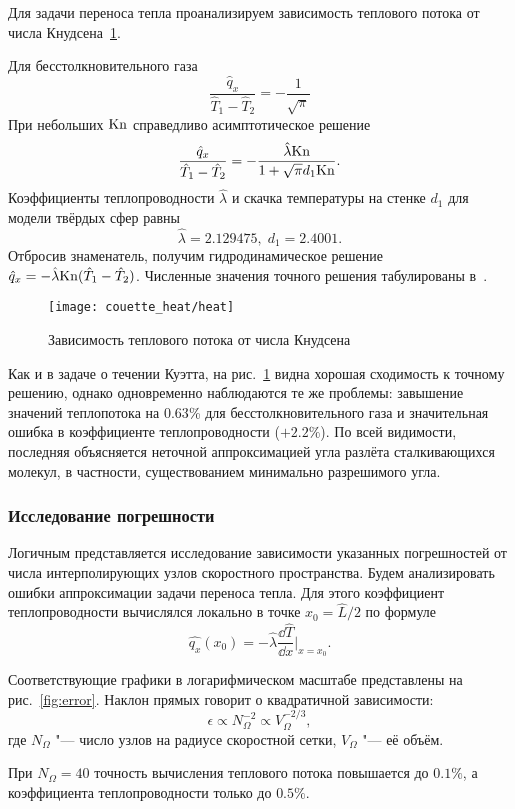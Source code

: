 Для задачи переноса тепла проанализируем зависимость теплового потока от числа Кнудсена~\ref{fig:heat}.

Для бесстолкновительного газа
\[ \frac{\hat{q}_x}{\hat{T}_1-\hat{T}_2} = -\frac1{\sqrt{\pi}} \]
При небольших \(\mathrm{Kn}\) справедливо асимптотическое решение
\[ \frac{\hat{q}_x}{\hat{T}_1-\hat{T}_2} = -\frac{\hat{\lambda}\mathrm{Kn}}{1+\sqrt{\pi}d_1\mathrm{Kn}}. \]
Коэффициенты теплопроводности \(\hat{\lambda}\) и скачка температуры на стенке \(d_1\) для модели твёрдых сфер равны~\cite{Sone2007}
\[ \hat{\lambda} = 2.129475, \; d_1 = 2.4001. \]
Отбросив знаменатель, получим гидродинамическое решение \(\hat{q}_x = -\hat{\lambda}\mathrm{Kn}(\hat{T}_1-\hat{T}_2)\).
Численные значения точного решения табулированы в~\cite{Sone2007}.

\begin{figure}
    \centering
    \texttt{[image: couette\_heat/heat]}
    \caption{Зависимость теплового потока от числа Кнудсена}\label{fig:heat}
\end{figure}

Как и в задаче о течении Куэтта, на рис.~\ref{fig:heat} видна хорошая сходимость к точному решению,
однако одновременно наблюдаются те же проблемы: завышение значений теплопотока на \(0.63\)\%
для бесстолкновительного газа и значительная ошибка в коэффициенте теплопроводности (\(+2.2\%\)).
По всей видимости, последняя объясняется неточной аппроксимацией угла разлёта сталкивающихся молекул,
в частности, существованием минимально разрешимого угла.

\subsubsection{Исследование погрешности}

Логичным представляется исследование зависимости указанных погрешностей от числа интерполирующих узлов
скоростного пространства. Будем анализировать ошибки аппроксимации задачи переноса тепла.
Для этого коэффициент теплопроводности вычислялся локально в точке \(x_0=\hat L/2\) по формуле
\[ \hat{q_x}(x_0) = -\hat{\lambda}\frac{\dd\hat T}{\dd x}\bigg|_{x=x_0}. \]

Соответствующие графики в логарифмическом масштабе представлены на рис.~\ref{fig:error}.
Наклон прямых говорит о квадратичной зависимости:
\[ \epsilon \propto N_\Omega^{-2} \propto V_\Omega^{-2/3}, \]
где \(N_\Omega\) "--- число узлов на радиусе скоростной сетки, \(V_\Omega\) "--- её объём.

При \(N_\Omega = 40\) точность вычисления теплового потока повышается до \(0.1\%\),
а коэффициента теплопроводности только до \(0.5\%\).

